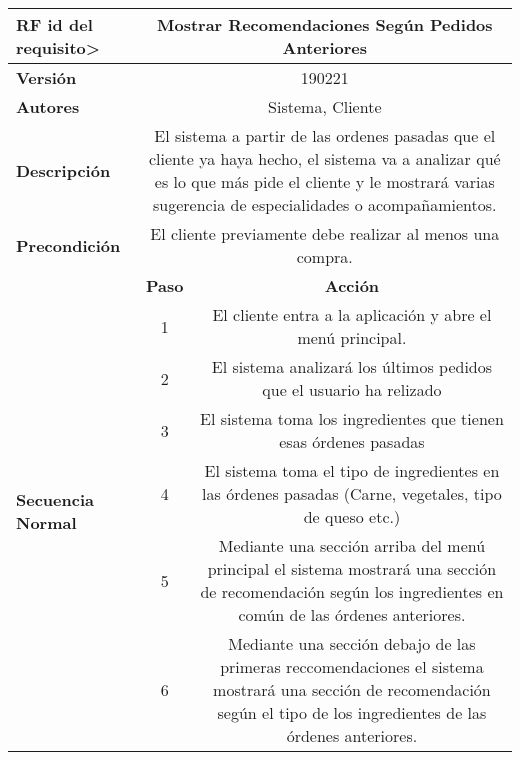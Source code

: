 \documentclass[conference]{IEEEtran}
\begin{document}
\begin{table}[H]
  \centering
  \begin{adjustbox}{width=0.45\textwidth}
    \begin{tabular}{|p{11.215em}|c|c|}
    \toprule
    \textbf{RF id del requisito>} & \multicolumn{2}{p{37.355em}|}{\textbf{Mostrar Recomendaciones Según Pedidos Anteriores}} \\
    \midrule
    \textbf{Versión} & \multicolumn{2}{c|}{190221} \\
    \midrule
    \textbf{Autores} & \multicolumn{2}{p{37.355em}|}{Sistema, Cliente} \\
    \midrule
    \textbf{Descripción} & \multicolumn{2}{p{37.355em}|}{El sistema a partir de las ordenes pasadas que el cliente ya haya hecho, el sistema va a analizar qué es lo que más pide el cliente y le mostrará varias sugerencia de especialidades o acompañamientos.} \\
    \midrule
    \textbf{Precondición} & \multicolumn{2}{p{37.355em}|}{El cliente previamente debe realizar al menos una compra.} \\
    \midrule
    \multirow{9}[16]{*}{\textbf{Secuencia Normal}} & \multicolumn{1}{p{5.355em}|}{\textbf{Paso}} & \multicolumn{1}{p{32em}|}{\textbf{Acción}} \\
\cmidrule{2-3}    \multicolumn{1}{|c|}{} & \multirow{2}[2]{*}{1} & \multicolumn{1}{c|}{\multirow{2}[2]{*}{El cliente entra a la aplicación y abre el menú principal.}} \\
    \multicolumn{1}{|c|}{} &       &  \\
\cmidrule{2-3}    \multicolumn{1}{|c|}{} & 2     & \multicolumn{1}{p{32em}|}{El sistema analizará los últimos pedidos que el usuario ha relizado} \\
\cmidrule{2-3}    \multicolumn{1}{|c|}{} & 3     & \multicolumn{1}{p{32em}|}{El sistema toma los ingredientes que tienen esas órdenes pasadas} \\
\cmidrule{2-3}    \multicolumn{1}{|c|}{} & 4     & \multicolumn{1}{p{32em}|}{El sistema toma el tipo de ingredientes en las órdenes pasadas (Carne, vegetales, tipo de queso etc.)} \\
\cmidrule{2-3}    \multicolumn{1}{|c|}{} & 5     & \multicolumn{1}{p{32em}|}{Mediante una sección arriba del menú principal el sistema mostrará una sección de recomendación según los ingredientes en común de las órdenes anteriores.} \\
\cmidrule{2-3}    \multicolumn{1}{|c|}{} & 6     & \multicolumn{1}{p{32em}|}{Mediante una sección debajo de las primeras reccomendaciones el sistema mostrará una sección de recomendación según el tipo de los ingredientes de las órdenes anteriores.} \\

\end{tabular}
\end{adjustbox}
\end{table}
\end{document}
